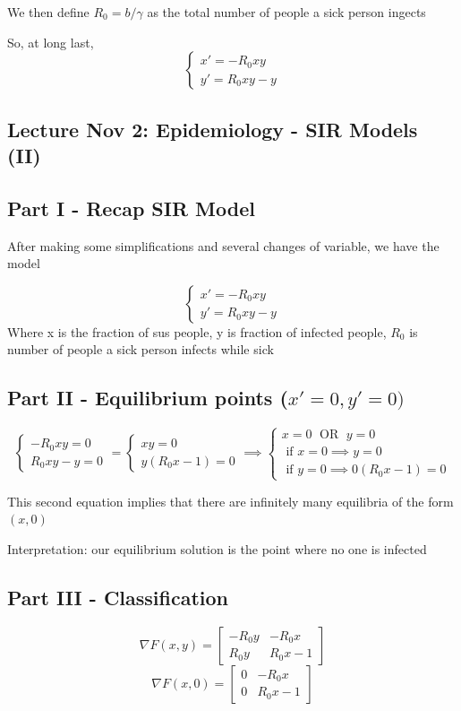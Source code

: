 \documentclass[12pt]{article}
\begin{document}
We then define $R_0 = b / \gamma$ as the total number of people a sick person ingects

So, at long last, 
\[\boxed{\begin{cases}
    x' = -R_0 xy\\
    y' = R_0 xy - y
\end{cases}}\]

\subsection{Lecture Nov 2:  Epidemiology - SIR Models (II)}
\subsection*{Part I - Recap SIR Model}
After making some simplifications and several changes of variable, we have the model

\[\begin{cases}
    x' = -R_0 xy\\
    y' = R_0 xy - y
\end{cases}\]
Where x is the fraction of sus people, y is fraction of infected people, $R_0$ is number of people a sick person infects while sick

\subsection*{Part II - Equilibrium points ($x' = 0, y' = 0)$}
\[\begin{cases}
    -R_0 xy = 0\\
    R_0 xy - y = 0
\end{cases} = \begin{cases}
    xy = 0\\
    y(R_0 x - 1) = 0
\end{cases} \implies \begin{cases}
    x = 0 \; \text{ OR } \; y = 0\\
    \text{ if } x = 0 \implies y = 0\\
    \text{ if } y = 0 \implies 0 (R_0 x - 1) = 0 
\end{cases}\]

This second equation implies that there are infinitely many equilibria of the form $(x, 0)$

Interpretation: our equilibrium solution is the point where no one is infected 

\subsection*{Part III - Classification}
\[\nabla F(x, y) = \begin{bmatrix}
    -R_0 y & -R_0 x\\
    R_0 y & R_0 x - 1
\end{bmatrix}\]
\[\nabla F(x, 0) = \begin{bmatrix}
    0 & -R_0 x\\
    0 & R_0 x - 1
\end{bmatrix}\]
\end{document}
